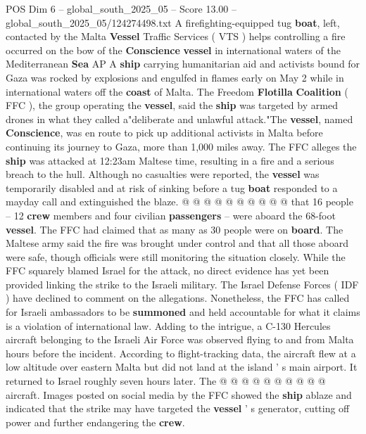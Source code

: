 \begin{textsample}{POS Dim 6 – global\_south\_2025\_05 – Score 13.00 – global\_south\_2025\_05/124274498.txt}  \label{ex:f6_pos_031}
A firefighting-equipped tug \textbf{boat}, left, contacted by the Malta \textbf{Vessel} Traffic Services ( VTS ) helps controlling a fire occurred on the bow of the \textbf{Conscience} \textbf{vessel} in international waters of the Mediterranean \textbf{Sea} AP A \textbf{ship} carrying humanitarian aid and activists bound for Gaza was rocked by explosions and engulfed in flames early on May 2 while in international waters off the \textbf{coast} of Malta.
The Freedom \textbf{Flotilla} \textbf{Coalition} ( FFC ), the group operating the \textbf{vessel}, said the \textbf{ship} was targeted by armed drones in what they called a"deliberate and unlawful attack."The \textbf{vessel}, named \textbf{Conscience}, was en route to pick up additional activists in Malta before continuing its journey to Gaza, more than 1,000 miles away.
The FFC alleges the \textbf{ship} was attacked at 12:23am Maltese time, resulting in a fire and a serious breach to the hull.
Although no casualties were reported, the \textbf{vessel} was temporarily disabled and at risk of sinking before a tug \textbf{boat} responded to a mayday call and extinguished the blaze. @ @ @ @ @ @ @ @ @ @ that 16 people -- 12 \textbf{crew} members and four civilian \textbf{passengers} -- were aboard the 68-foot \textbf{vessel}.
The FFC had claimed that as many as 30 people were on \textbf{board}.
The Maltese army said the fire was brought under control and that all those aboard were safe, though officials were still monitoring the situation closely.
While the FFC squarely blamed Israel for the attack, no direct evidence has yet been provided linking the strike to the Israeli military.
The Israel Defense Forces ( IDF ) have declined to comment on the allegations.
Nonetheless, the FFC has called for Israeli ambassadors to be \textbf{summoned} and held accountable for what it claims is a violation of international law.
Adding to the intrigue, a C-130 Hercules aircraft belonging to the Israeli Air Force was observed flying to and from Malta hours before the incident.
According to flight-tracking data, the aircraft flew at a low altitude over eastern Malta but did not land at the island ' s main airport.
It returned to Israel roughly seven hours later.
The @ @ @ @ @ @ @ @ @ @ aircraft.
Images posted on social media by the FFC showed the \textbf{ship} ablaze and indicated that the strike may have targeted the \textbf{vessel} ' s generator, cutting off power and further endangering the \textbf{crew}.

\end{textsample}

